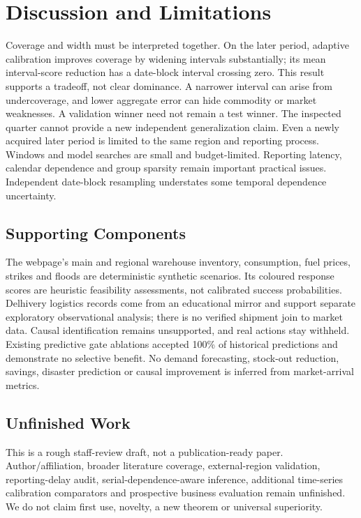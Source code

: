 \documentclass[conference]{IEEEtran}
\begin{document}
\section{Discussion and Limitations}
Coverage and width must be interpreted together. On the later period, adaptive calibration improves coverage by widening intervals substantially; its mean interval-score reduction has a date-block interval crossing zero. This result supports a tradeoff, not clear dominance. A narrower interval can arise from undercoverage, and lower aggregate error can hide commodity or market weaknesses. A validation winner need not remain a test winner. The inspected quarter cannot provide a new independent generalization claim. Even a newly acquired later period is limited to the same region and reporting process. Windows and model searches are small and budget-limited. Reporting latency, calendar dependence and group sparsity remain important practical issues. Independent date-block resampling understates some temporal dependence uncertainty.
\subsection{Supporting Components}
The webpage's main and regional warehouse inventory, consumption, fuel prices, strikes and floods are deterministic synthetic scenarios. Its coloured response scores are heuristic feasibility assessments, not calibrated success probabilities. Delhivery logistics records come from an educational mirror and support separate exploratory observational analysis; there is no verified shipment join to market data. Causal identification remains unsupported, and real actions stay withheld. Existing predictive gate ablations accepted 100\% of historical predictions and demonstrate no selective benefit. No demand forecasting, stock-out reduction, savings, disaster prediction or causal improvement is inferred from market-arrival metrics.
\subsection{Unfinished Work}
This is a rough staff-review draft, not a publication-ready paper. Author/affiliation, broader literature coverage, external-region validation, reporting-delay audit, serial-dependence-aware inference, additional time-series calibration comparators and prospective business evaluation remain unfinished. We do not claim first use, novelty, a new theorem or universal superiority.
\end{document}
